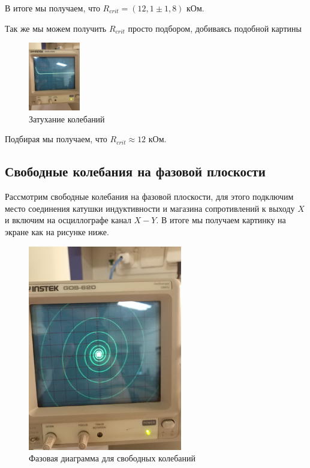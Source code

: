 \documentclass[a4paper, 12pt]{article}%
\begin{document}
В итоге мы получаем, что $R_{crit} = (12,1 \pm 1,8)$ кОм.

Так же мы можем получить $R_{crit}$ просто подбором, добиваясь подобной картины

\begin{figure}[h]
\begin{center}
\includegraphics[width = 0.2\textwidth]{2.jpg}
\caption{Затухание колебаний}
\end{center}
\end{figure}

Подбирая мы получаем, что $R_{crit} \approx 12$ кОм.
\newpage
\subsection*{Свободные колебания на фазовой плоскости}
Рассмотрим свободные колебания на фазовой плоскости, для этого подключим место соединения катушки индуктивности и магазина сопротивлений к выходу $X$ и включим на осциллографе канал $X-Y$. В итоге мы получаем картинку на экране как на рисунке ниже. 
\begin{figure}[h!]
\begin{center}
\includegraphics[width = 0.6\textwidth]{1.jpg}
\caption{Фазовая диаграмма для свободных колебаний}
\end{center}
\end{figure}
\end{document}
